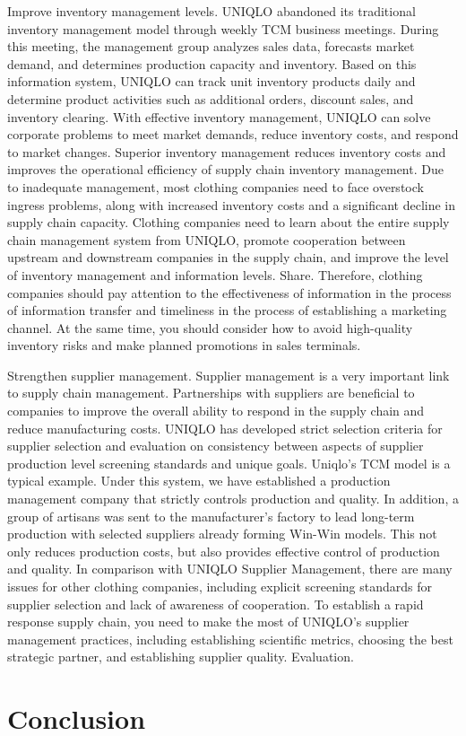 \documentclass[12pt,]{article}
\begin{document}
Improve inventory management levels. UNIQLO abandoned its traditional
inventory management model through weekly TCM business meetings. During
this meeting, the management group analyzes sales data, forecasts market
demand, and determines production capacity and inventory. Based on this
information system, UNIQLO can track unit inventory products daily and
determine product activities such as additional orders, discount sales,
and inventory clearing. With effective inventory management, UNIQLO can
solve corporate problems to meet market demands, reduce inventory costs,
and respond to market changes. Superior inventory management reduces
inventory costs and improves the operational efficiency of supply chain
inventory management. Due to inadequate management, most clothing
companies need to face overstock ingress problems, along with increased
inventory costs and a significant decline in supply chain capacity.
Clothing companies need to learn about the entire supply chain
management system from UNIQLO, promote cooperation between upstream and
downstream companies in the supply chain, and improve the level of
inventory management and information levels. Share. Therefore, clothing
companies should pay attention to the effectiveness of information in
the process of information transfer and timeliness in the process of
establishing a marketing channel. At the same time, you should consider
how to avoid high-quality inventory risks and make planned promotions in
sales terminals.

Strengthen supplier management. Supplier management is a very important
link to supply chain management. Partnerships with suppliers are
beneficial to companies to improve the overall ability to respond in the
supply chain and reduce manufacturing costs. UNIQLO has developed strict
selection criteria for supplier selection and evaluation on consistency
between aspects of supplier production level screening standards and
unique goals. Uniqlo's TCM model is a typical example. Under this
system, we have established a production management company that
strictly controls production and quality. In addition, a group of
artisans was sent to the manufacturer's factory to lead long-term
production with selected suppliers already forming Win-Win models. This
not only reduces production costs, but also provides effective control
of production and quality. In comparison with UNIQLO Supplier
Management, there are many issues for other clothing companies,
including explicit screening standards for supplier selection and lack
of awareness of cooperation. To establish a rapid response supply chain,
you need to make the most of UNIQLO's supplier management practices,
including establishing scientific metrics, choosing the best strategic
partner, and establishing supplier quality. Evaluation.

\hypertarget{conclusion}{%
\section{Conclusion}\label{conclusion}}
\end{document}
